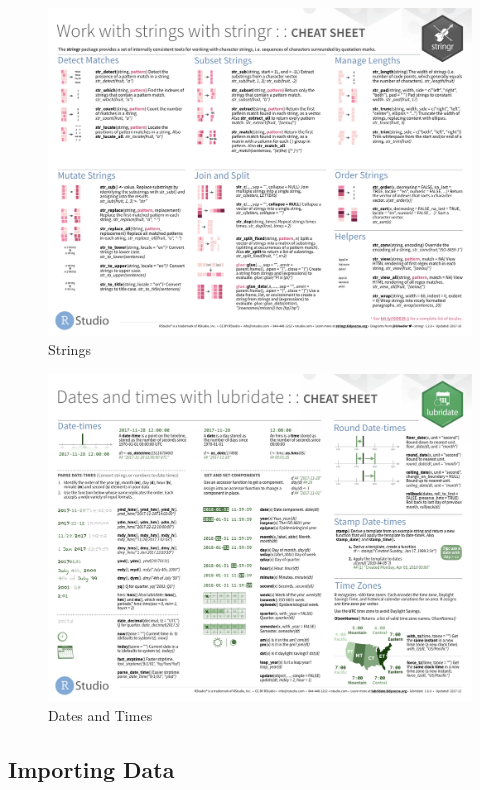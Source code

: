 \documentclass[]{book}
\theoremstyle{definition}
\theoremstyle{definition}
\theoremstyle{definition}
\theoremstyle{remark}
\begin{document}
\begin{figure}

{\centering \includegraphics[width=0.8\linewidth]{images/strings} 

}

\caption{Strings}\label{fig:strings-cheatsheet}
\end{figure}

\begin{figure}

{\centering \includegraphics[width=0.8\linewidth]{images/lubridate} 

}

\caption{Dates and Times}\label{fig:lubridate-cheatsheet}
\end{figure}

\subsection{Importing Data}\label{importing-data}
\end{document}
